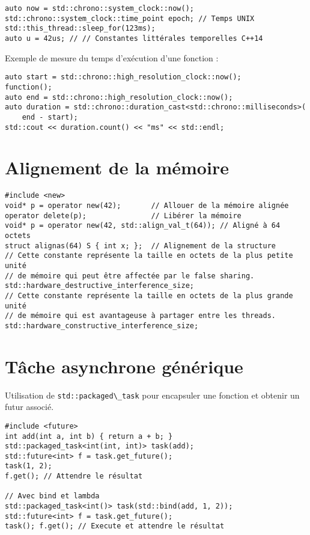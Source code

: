 \documentclass{article}
\newcommand{\cd}{\lstinline}
\begin{document}
\begin{multicols*}{3}
\begin{lstlisting}
auto now = std::chrono::system_clock::now();
std::chrono::system_clock::time_point epoch; // Temps UNIX
std::this_thread::sleep_for(123ms);
auto u = 42us; // // Constantes littérales temporelles C++14
\end{lstlisting}

Exemple de mesure du temps d'exécution d'une fonction :

\begin{lstlisting}
auto start = std::chrono::high_resolution_clock::now();
function();
auto end = std::chrono::high_resolution_clock::now();
auto duration = std::chrono::duration_cast<std::chrono::milliseconds>(
    end - start);
std::cout << duration.count() << "ms" << std::endl;
\end{lstlisting}

\section*{Alignement de la mémoire}

\begin{lstlisting}
#include <new>
void* p = operator new(42);       // Allouer de la mémoire alignée
operator delete(p);               // Libérer la mémoire
void* p = operator new(42, std::align_val_t(64)); // Aligné à 64 octets
struct alignas(64) S { int x; };  // Alignement de la structure
// Cette constante représente la taille en octets de la plus petite unité
// de mémoire qui peut être affectée par le false sharing.
std::hardware_destructive_interference_size;
// Cette constante représente la taille en octets de la plus grande unité
// de mémoire qui est avantageuse à partager entre les threads.
std::hardware_constructive_interference_size;
\end{lstlisting}

\section*{Tâche asynchrone générique}
Utilisation de \cd{std::packaged\_task} pour encapsuler une fonction et obtenir un futur associé.

\begin{lstlisting}
#include <future>
int add(int a, int b) { return a + b; }
std::packaged_task<int(int, int)> task(add);
std::future<int> f = task.get_future();
task(1, 2);
f.get(); // Attendre le résultat

// Avec bind et lambda
std::packaged_task<int()> task(std::bind(add, 1, 2));
std::future<int> f = task.get_future();
task(); f.get(); // Execute et attendre le résultat


\end{lstlisting}
\end{multicols*}
\end{document}
